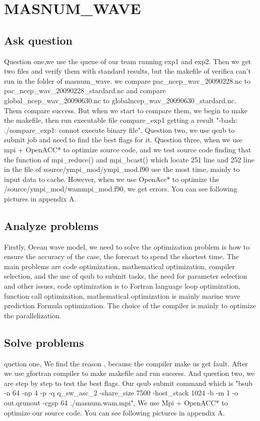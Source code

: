 \documentclass[conference,compsoc]{appendix/report}
\begin{document}

\section{MASNUM\_WAVE}
\subsection{Ask question}
Question one,we use the queue of our team running exp1 and exp2. Then we get two files and verify them with standard results, but the makefile of verifica can't run in the folder of masnum\_wave. we compare pac\_ncep\_wav\_20090228.nc to pac\_ncep\_wav\_20090228\_stardard.nc and compare global\_ncep\_wav\_20090630.nc to globalncep\_wav\_20090630\_stardard.nc. Them compare success. But when we start to compare them, we begin to make the makefile, then run executable file compare\_exp1 getting a result "-bash: ./compare\_exp1: connot execute binary file". 
Question two, we use qsub to submit job and need to find the best flags for it.
Question three, when we use mpi + OpenACC* to optimize source code, and we test source code finding that the function of mpi\_reduce() and mpi\_bcast() which locate 251 line and 252 line in the file of source/ympi\_mod/ympi\_mod.f90 use the most time, mainly to input data to cache. However, when we use OpenAcc* to optimize the /source/ympi\_mod/wammpi\_mod.f90, we get errors. You can see following pictures in appendix A.

\subsection{Analyze problems}
Firstly,  Ocean wave model, we need to solve the optimization problem is how to ensure the accuracy of the case, the forecast to spend the shortest time. The main problems are code optimization, mathematical optimization, compiler selection, and the use of qsub to submit tasks, the need for parameter selection and other issues, code optimization is to Fortran language loop optimization, function call optimization, mathematical optimization is mainly marine wave prediction Formula optimization. The choice of the compiler is mainly to optimize the parallelization.

\subsection{Solve problems}
quetion one, We find the reason , because the compiler make us get fault. After we use gfortran compiler to make makefile and run success. And question two, we are step by step to test the best flags.  Our qsub submit command which is "bsub -n 64 -np 4 -p -q q\_sw\_asc\_2 -share\_size 7500 -host\_stack 1024 -b -m 1 -o out.qrunout -cgsp 64 ./masnum.wam.mpi", We use Mpi + OpenACC* to optimize our source code. You can see following pictures in appendix A.
\end{document}
